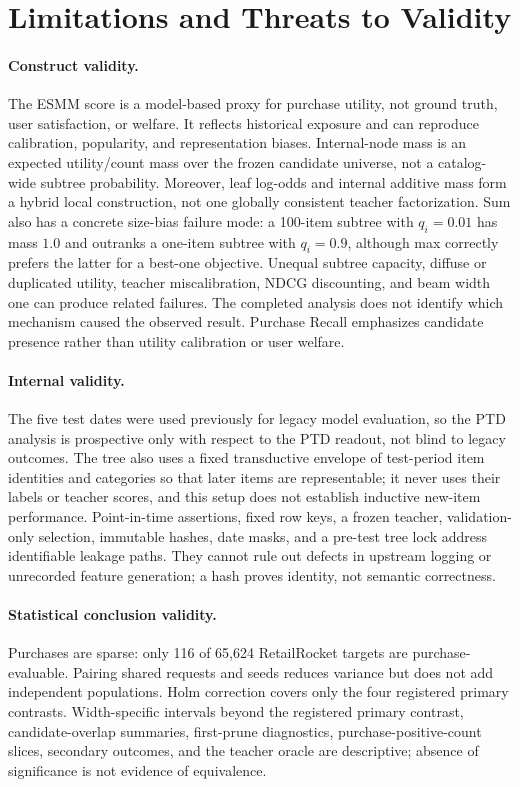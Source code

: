 \documentclass[sigconf,natbib=true]{acmart}
\begin{document}


\section{Limitations and Threats to Validity}
\paragraph{Construct validity.}
The ESMM score is a model-based proxy for purchase utility, not ground truth, user satisfaction, or welfare. It reflects historical exposure and can reproduce calibration, popularity, and representation biases. Internal-node mass is an expected utility/count mass over the frozen candidate universe, not a catalog-wide subtree probability. Moreover, leaf log-odds and internal additive mass form a hybrid local construction, not one globally consistent teacher factorization. Sum also has a concrete size-bias failure mode: a 100-item subtree with $q_i=0.01$ has mass $1.0$ and outranks a one-item subtree with $q_i=0.9$, although max correctly prefers the latter for a best-one objective. Unequal subtree capacity, diffuse or duplicated utility, teacher miscalibration, NDCG discounting, and beam width one can produce related failures. The completed analysis does not identify which mechanism caused the observed result. Purchase Recall emphasizes candidate presence rather than utility calibration or user welfare.

\paragraph{Internal validity.}
The five test dates were used previously for legacy model evaluation, so the PTD analysis is prospective only with respect to the PTD readout, not blind to legacy outcomes. The tree also uses a fixed transductive envelope of test-period item identities and categories so that later items are representable; it never uses their labels or teacher scores, and this setup does not establish inductive new-item performance. Point-in-time assertions, fixed row keys, a frozen teacher, validation-only selection, immutable hashes, date masks, and a pre-test tree lock address identifiable leakage paths. They cannot rule out defects in upstream logging or unrecorded feature generation; a hash proves identity, not semantic correctness.

\paragraph{Statistical conclusion validity.}
Purchases are sparse: only 116 of 65,624 RetailRocket targets are purchase-evaluable. Pairing shared requests and seeds reduces variance but does not add independent populations. Holm correction covers only the four registered primary contrasts. Width-specific intervals beyond the registered primary contrast, candidate-overlap summaries, first-prune diagnostics, purchase-positive-count slices, secondary outcomes, and the teacher oracle are descriptive; absence of significance is not evidence of equivalence.
\end{document}
